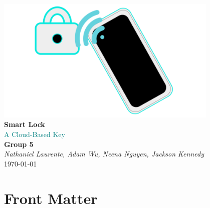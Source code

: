 \documentclass[a4paper,12pt]{article}
\begin{document}
\begin{titlepage}
    \begin{center}
        \vspace*{2cm}

        \includegraphics[width=0.8\textwidth]{./img/slimg.png}\\[1cm]

        {\Huge \textbf{Smart Lock}}\\[0.5cm]
        {\textcolor{teal}{\Large A Cloud-Based Key}}\\[1.5cm]

        {\LARGE \textbf{Group 5}}\\[0.5cm]
        {\Large \textit{Nathaniel Laurente, Adam Wu, Neena Nguyen, Jackson Kennedy}}\\[2cm]

        {\Large \today}
    \end{center}
\end{titlepage}

\newpage
{}
\pagestyle{fancy}      





\section{Front Matter}






\tableofcontents









\end{document}
